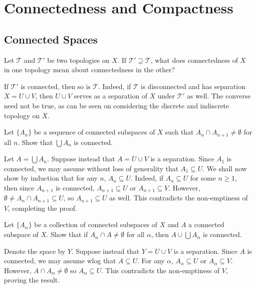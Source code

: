 \section{Connectedness and Compactness}

\setcounter{subsection}{22}
\subsection{Connected Spaces}

	\begin{exercise}
		Let $\mathcal{T}$ and $\mathcal{T}'$ be two topologies on $X$. If $\mathcal{T}'\supseteq\mathcal{T}$, what does connectedness of $X$ in one topology mean about connectedness in the other?
	\end{exercise}
	\begin{solution*}
		If $\mathcal{T}'$ is connected, then so is $\mathcal{T}$. Indeed, if $\mathcal{T}$ is disconnected and has separation $X=U\cup V$, then $U\cup V$ serves as a separation of $X$ under $\mathcal{T}'$ as well. The converse need not be true, as can be seen on considering the discrete and indiscrete topology on $X$.
	\end{solution*}

	\begin{exercise}
		Let $\{A_n\}$ be a sequence of connected subspaces of $X$ such that $A_n\cap A_{n+1}\neq\emptyset$ for all $n$. Show that $\bigcup A_n$ is connected.
	\end{exercise}
	\begin{solution*}
		Let $A = \bigcup A_n$. Suppose instead that $A=U\cup V$ is a separation. Since $A_1$ is connected, we may assume without loss of generality that $A_1\subseteq U$. We shall now show by induction that for any $n$, $A_n\subseteq U$. Indeed, if $A_n\subseteq U$ for some $n\geq 1$, then since $A_{n+1}$ is connected, $A_{n+1}\subseteq U$ or $A_{n+1}\subseteq V$. However, $\emptyset\neq A_n\cap A_{n+1}\subseteq U$, so $A_{n+1}\subseteq U$ as well. This contradicts the non-emptiness of $V$, completing the proof.
	\end{solution*}

	\begin{exercise}
		Let $\{A_\alpha\}$ be a collection of connected subspaces of $X$ and $A$ a connected subspace of $X$. Show that if $A_\alpha\cap A\neq\emptyset$ for all $\alpha$, then $A\cup\bigcup A_\alpha$ is connected.
	\end{exercise}
	\begin{solution*}
		Denote the space by $Y$. Suppose instead that $Y=U\cup V$ is a separation. Since $A$ is connected, we may assume wlog that $A\subseteq U$. For any $\alpha$, $A_\alpha\subseteq U$ or $A_\alpha\subseteq V$. However, $A\cap A_\alpha \neq \emptyset$ so $A_\alpha\subseteq U$. This contradicts the non-emptiness of $V$, proving the result.
	\end{solution*}


